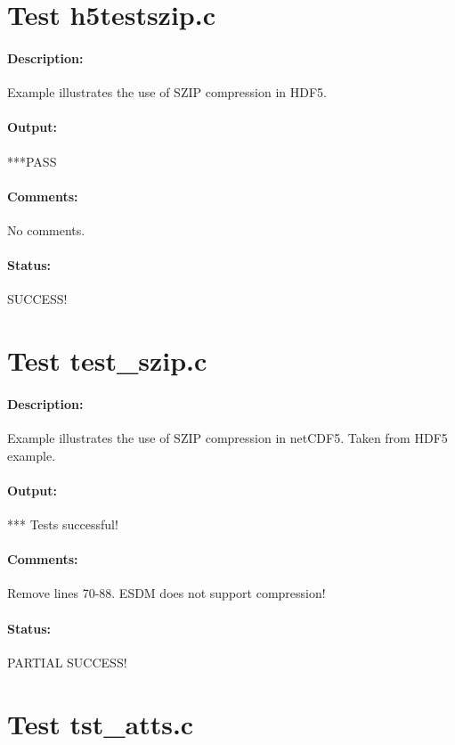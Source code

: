 \section{Test h5testszip.c}

\paragraph{Description:} Example illustrates the use of SZIP compression in HDF5.

\paragraph{Output:} ***PASS

\paragraph{Comments:} No comments.

\paragraph{Status:} SUCCESS!

\section{Test test\_szip.c}

\paragraph{Description:} Example illustrates the use of SZIP compression in netCDF5.
Taken from HDF5 example.

\paragraph{Output:} *** Tests successful!

\paragraph{Comments:} Remove lines 70-88. ESDM does not support compression!

\paragraph{Status:} PARTIAL SUCCESS!

\section{Test tst\_atts.c}

